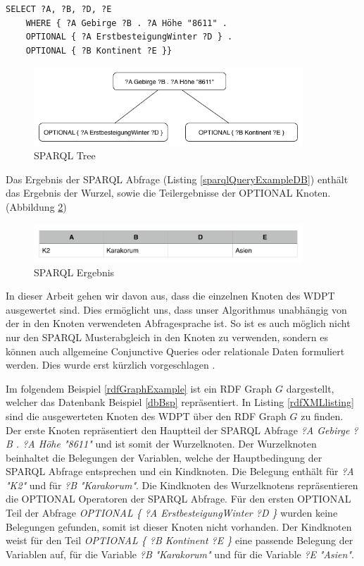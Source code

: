 \documentclass[draft,final]{vutinfth} %
\begin{document}
\begin{lstlisting}[float,language=Sparql,caption={SPARQL DB Beispiel},frame = single,label={sparqlQueryExampleDB}]
SELECT ?A, ?B, ?D, ?E
	WHERE { ?A Gebirge ?B . ?A Höhe "8611" . 
	OPTIONAL { ?A ErstbesteigungWinter ?D } .
	OPTIONAL { ?B Kontinent ?E }}
\end{lstlisting}

\begin{figure}[ht]
	\centering
	\includegraphics[width=0.9\textwidth]{SPARQL}
	\caption{SPARQL Tree}
	\label{sparqlTree}
\end{figure}

Das Ergebnis der SPARQL Abfrage (Listing \ref{sparqlQueryExampleDB}) enthält das Ergebnis der Wurzel, sowie die Teilergebnisse der OPTIONAL Knoten. (Abbildung \ref{sparqlErgebnis})

\begin{figure}[ht]
	\centering
	\includegraphics[width=0.9\textwidth]{sparqlErgebnis}
	\caption{SPARQL Ergebnis}
	\label{sparqlErgebnis}
\end{figure}

In dieser Arbeit gehen wir davon aus, dass die einzelnen Knoten des WDPT ausgewertet sind.  Dies ermöglicht uns, dass unser Algorithmus unabhängig von der in den Knoten verwendeten Abfragesprache ist. So ist es auch möglich nicht nur den SPARQL Musterabgleich in den Knoten zu verwenden, sondern es können auch allgemeine Conjunctive Queries oder relationale Daten formuliert werden. Dies wurde erst kürzlich vorgeschlagen \cite{DBLP:conf/pods/BarceloPS15}. 

Im folgendem Beispiel \ref{rdfGraphExample} ist ein RDF Graph $G$ dargestellt, welcher das Datenbank Beispiel \ref{dbBsp} repräsentiert. In Listing \ref{rdfXMLlisting} sind die ausgewerteten Knoten des WDPT über den RDF Graph $G$ zu finden. Der erste Knoten repräsentiert den Hauptteil der SPARQL Abfrage \textit{?A Gebirge ?B . ?A Höhe "8611"} und ist somit der Wurzelknoten. Der Wurzelknoten beinhaltet die Belegungen der Variablen, welche der Hauptbedingung der SPARQL Abfrage entsprechen und ein Kindknoten. Die Belegung enthält für \textit{?A} \textit{"K2"} und für \textit{?B} \textit{"Karakorum"}. Die Kindknoten des Wurzelknotens repräsentieren die OPTIONAL Operatoren der SPARQL Abfrage. Für den ersten OPTIONAL Teil der Abfrage \textit{ OPTIONAL \{ ?A ErstbesteigungWinter ?D \} } wurden keine Belegungen gefunden, somit ist dieser Knoten nicht vorhanden. Der Kindknoten weist für den Teil \textit{OPTIONAL \{ ?B Kontinent ?E \} } eine passende Belegung der Variablen auf, für die Variable \textit{?B} \textit{"Karakorum"} und für die Variable \textit{?E} \textit{"Asien"}. 
\end{document}
